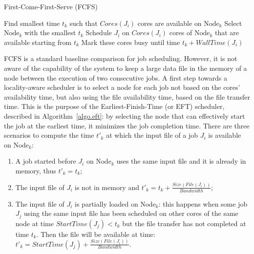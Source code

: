 \documentclass[conference,10pt]{IEEEtran}
\newcommand{\Node}[1]{\ensuremath{\mathrm{Node}_{#1}}\xspace}
\newcommand{\file}{\ensuremath{\mathit{File}}\xspace}
\newcommand{\size}{\ensuremath{\mathit{Size}}\xspace}
\newcommand{\bandwidth}{\mathit{Bandwidth}\xspace}
\newcommand{\core}{\mathit{Cores}\xspace}
\newcommand{\walltime}{\mathit{WallTime}\xspace}
\newcommand{\start}{\mathit{StartTime}\xspace}
\newcommand{\nodeset}{\ensuremath{\mathbb{N}}\xspace}
\begin{document}
\begin{algorithm}[htbp]%
\caption{First-Come-First-Serve (FCFS)}\label{algo.fcfs}
\begin{algorithmic}[1]
        \ForEach{$\Node{k} \in \nodeset$}
        \State Find smallest time $t_k$ such that $\core(J_i)$ cores are available on \Node{k}\label{fcfs.ln.find}
        \EndFor
        \State Select \Node{k}  with the smallest $t_k$
        \State Schedule $J_i$ on $\core(J_i)$ cores of \Node{k} that are available starting from $t_k$
        \State Mark these cores busy until time $t_k +\walltime(J_i)$
	\EndFor
	\end{algorithmic}
\end{algorithm}


FCFS is a standard baseline comparison
for job scheduling. However, it is not aware of the capability of the
system to keep a large data file in the memory of a node between the execution of
two consecutive jobs.
A first step towards a locality-aware scheduler
is to select a node for each job not based on the cores' availability
time, but also using the file availability time, based on the file
transfer time. This is the purpose of the Earliest-Finish-Time (or
EFT) scheduler, described in Algorithm~\ref{algo.eft}: by selecting
the node that can effectively start the job at the earliest time, it
minimizes the job completion time. There are three scenarios to compute the
time $t'_k$ at which the input file of a job $J_i$ is available on
\Node{k}:
\begin{enumerate}
\item A job started before $J_i$ on \Node{k} uses the same input
  file and it is already in memory, thus $t'_k=t_k$;
\item The input file of $J_i$ is not in memory and
  $t'_k=t_k+\frac{\size(\file(J_i))}{\bandwidth}$;
\item The input file of $J_i$ is partially loaded on \Node{k}: this
  happens when some
  job $J_j$ using the same input file has been scheduled on other cores of
  the same node at time $\start(J_j)<t_k$ but the file transfer has not
  completed at time $t_k$. Then the file will be available at time:
  $t'_k = \start(J_j)+\frac{\size(\file(J_i))}{\bandwidth}.$
\end{enumerate}
\end{document}
